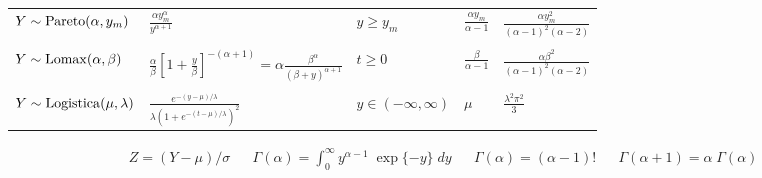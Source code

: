 \begin{tabular}{lllll}
  \\
$Y \sim {\rm Pareto}(\alpha, y_m)$ & $\frac{\alpha y_m^{\alpha}}{y^{\alpha+1}}$  &  $y \geq y_m$  & $\frac{\alpha y_m}{\alpha - 1}$ &  $\frac{\alpha y_m^2}{(\alpha - 1)^2 (\alpha - 2)}$ \\
\\
$Y \sim {\rm Lomax}(\alpha, \beta)$ & $\frac{\alpha}{\beta} \left[1 + \frac{y}{\beta} \right]^{-(\alpha+1)} = \alpha \frac{\beta^\alpha}{(\beta+y)^{\alpha + 1}}$  &  $t \geq 0$  & $\frac{\beta}{\alpha - 1}$ &  $\frac{\alpha \beta^2}{(\alpha - 1)^2 (\alpha - 2)}$ \\
\\
$Y \sim {\rm Logistica}(\mu, \lambda)$ & $\frac{e^{-(y-\mu)/\lambda}}{\lambda\left(1+e^{-(t-\mu)/\lambda}\right)^2}$  & $y \in (-\infty, \infty)$ & $\mu$ & $\frac{\lambda^2 \pi^2}{3}$ \\
\hline
\end{tabular}

\begin{align*}
& Z = (Y-\mu)/\sigma &
&\Gamma(\alpha) = \int_0^{\infty} y^{\alpha-1} \; \exp\{-y\} \; dy &
& \Gamma(\alpha) = (\alpha-1)! &
& \Gamma(\alpha+1) = \alpha\;\Gamma(\alpha)
\end{align*}


